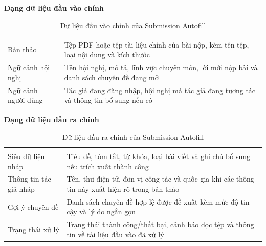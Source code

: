 \textbf{Dạng dữ liệu đầu vào chính}

\begingroup
\setlength{\tabcolsep}{2pt}
\renewcommand{\arraystretch}{1.15}
\begin{longtable}{|C{0.46\textwidth}|P{0.46\textwidth}|}
  \caption{Dữ liệu đầu vào chính của Submission Autofill}\label{tab:ch3-autofill-input}\\
  \hline
       &     \\ \hline
  \endfirsthead
  \hline
       &     \\ \hline
  \endhead
  Bản thảo   &   Tệp PDF hoặc tệp tài liệu chính của bài nộp, kèm tên tệp, loại nội dung và kích thước \\ \hline
  Ngữ cảnh hội nghị      &      Tên hội nghị, mô tả, lĩnh vực chuyên môn, lời mời nộp bài và danh sách chuyên đề đang mở \\ \hline
  Ngữ cảnh người dùng     &     Tác giả đang đăng nhập, hội nghị mà tác giả đang tương tác và thông tin bổ sung nếu có \\ \hline
\end{longtable}
\endgroup

\textbf{Dạng dữ liệu đầu ra chính}

\begingroup
\setlength{\tabcolsep}{2pt}
\renewcommand{\arraystretch}{1.15}
\begin{longtable}{|C{0.46\textwidth}|P{0.46\textwidth}|}
  \caption{Dữ liệu đầu ra chính của Submission Autofill}\label{tab:ch3-autofill-output}\\
  \hline
       &     \\ \hline
  \endfirsthead
  \hline
       &     \\ \hline
  \endhead
  Siêu dữ liệu nháp   &   Tiêu đề, tóm tắt, từ khóa, loại bài viết và ghi chú bổ sung nếu trích xuất thành công \\ \hline
  Thông tin tác giả nháp      &      Tên, thư điện tử, đơn vị công tác và quốc gia khi các thông tin này xuất hiện rõ trong bản thảo \\ \hline
  Gợi ý chuyên đề     &     Danh sách chuyên đề hợp lệ được đề xuất kèm mức độ tin cậy và lý do ngắn gọn \\ \hline
  Trạng thái xử lý      &      Trạng thái thành công/thất bại, cảnh báo đọc tệp và thông tin về tài liệu đầu vào đã xử lý \\ \hline
\end{longtable}
\endgroup

